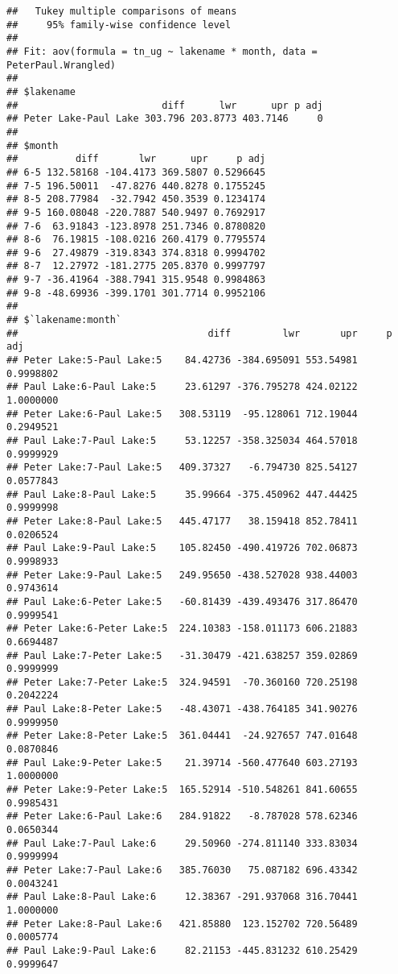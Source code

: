\documentclass[]{article}
\begin{document}
\begin{verbatim}
##   Tukey multiple comparisons of means
##     95% family-wise confidence level
## 
## Fit: aov(formula = tn_ug ~ lakename * month, data = PeterPaul.Wrangled)
## 
## $lakename
##                         diff      lwr      upr p adj
## Peter Lake-Paul Lake 303.796 203.8773 403.7146     0
## 
## $month
##          diff       lwr      upr     p adj
## 6-5 132.58168 -104.4173 369.5807 0.5296645
## 7-5 196.50011  -47.8276 440.8278 0.1755245
## 8-5 208.77984  -32.7942 450.3539 0.1234174
## 9-5 160.08048 -220.7887 540.9497 0.7692917
## 7-6  63.91843 -123.8978 251.7346 0.8780820
## 8-6  76.19815 -108.0216 260.4179 0.7795574
## 9-6  27.49879 -319.8343 374.8318 0.9994702
## 8-7  12.27972 -181.2775 205.8370 0.9997797
## 9-7 -36.41964 -388.7941 315.9548 0.9984863
## 9-8 -48.69936 -399.1701 301.7714 0.9952106
## 
## $`lakename:month`
##                                 diff         lwr       upr     p adj
## Peter Lake:5-Paul Lake:5    84.42736 -384.695091 553.54981 0.9998802
## Paul Lake:6-Paul Lake:5     23.61297 -376.795278 424.02122 1.0000000
## Peter Lake:6-Paul Lake:5   308.53119  -95.128061 712.19044 0.2949521
## Paul Lake:7-Paul Lake:5     53.12257 -358.325034 464.57018 0.9999929
## Peter Lake:7-Paul Lake:5   409.37327   -6.794730 825.54127 0.0577843
## Paul Lake:8-Paul Lake:5     35.99664 -375.450962 447.44425 0.9999998
## Peter Lake:8-Paul Lake:5   445.47177   38.159418 852.78411 0.0206524
## Paul Lake:9-Paul Lake:5    105.82450 -490.419726 702.06873 0.9998933
## Peter Lake:9-Paul Lake:5   249.95650 -438.527028 938.44003 0.9743614
## Paul Lake:6-Peter Lake:5   -60.81439 -439.493476 317.86470 0.9999541
## Peter Lake:6-Peter Lake:5  224.10383 -158.011173 606.21883 0.6694487
## Paul Lake:7-Peter Lake:5   -31.30479 -421.638257 359.02869 0.9999999
## Peter Lake:7-Peter Lake:5  324.94591  -70.360160 720.25198 0.2042224
## Paul Lake:8-Peter Lake:5   -48.43071 -438.764185 341.90276 0.9999950
## Peter Lake:8-Peter Lake:5  361.04441  -24.927657 747.01648 0.0870846
## Paul Lake:9-Peter Lake:5    21.39714 -560.477640 603.27193 1.0000000
## Peter Lake:9-Peter Lake:5  165.52914 -510.548261 841.60655 0.9985431
## Peter Lake:6-Paul Lake:6   284.91822   -8.787028 578.62346 0.0650344
## Paul Lake:7-Paul Lake:6     29.50960 -274.811140 333.83034 0.9999994
## Peter Lake:7-Paul Lake:6   385.76030   75.087182 696.43342 0.0043241
## Paul Lake:8-Paul Lake:6     12.38367 -291.937068 316.70441 1.0000000
## Peter Lake:8-Paul Lake:6   421.85880  123.152702 720.56489 0.0005774
## Paul Lake:9-Paul Lake:6     82.21153 -445.831232 610.25429 0.9999647

\end{verbatim}
\end{document}
